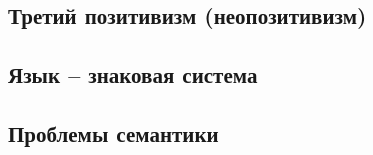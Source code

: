 \documentclass[main.tex]{subfiles}
\begin{document}

\subsection{Третий позитивизм (неопозитивизм)}








\subsection{Язык -- знаковая система}




\subsection{Проблемы семантики}

\end{document}
